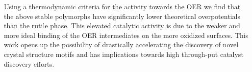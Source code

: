 %
Using a thermodynamic criteria for the activity towards the OER we find that the above stable \IrOthree polymorphs have significantly lower theoretical overpotentials than the rutile \IrOtwo phase.
%
This elevated catalytic activity is due to the weaker and more ideal binding of the OER intermediates on the more oxidized \IrOthree surfaces.
%
This work opens up the possibility of drastically accelerating the discovery of novel crystal structure motifs and has implications towards high through-put catalyst discovery efforts.
